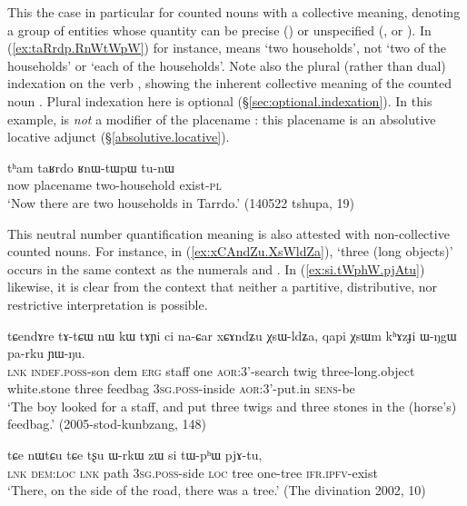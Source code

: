 This the case in particular for counted nouns with a collective meaning, denoting a group of entities whose quantity can be precise () or unspecified (,  or ). In (\ref{ex:taRrdp.RnWtWpW}) for instance,  means `two households', not `two of the households' or `each of the households'. Note also the plural (rather than dual) indexation on the verb , showing the inherent collective meaning of the counted noun . Plural indexation here is optional (§\ref{sec:optional.indexation}). In this example,  is \textit{not} a modifier of the placename : this placename is an absolutive locative adjunct (§\ref{absolutive.locative}).

\begin{exe}
	\ex \label{ex:taRrdp.RnWtWpW}
	\gll tʰam taʁrdo ʁnɯ-tɯpɯ tu-nɯ \\
	now placename two-household exist-\textsc{pl} \\
	\glt `Now there are two households in Tarrdo.' (140522 tshupa, 19)
\end{exe} 


This neutral number quantification meaning is also attested with non-collective counted nouns. For instance, in (\ref{ex:xCAndZu.XsWldZa}),  `three (long objects)' occurs in the same context as the numerals  and . In (\ref{ex:si.tWphW.pjAtu}) likewise, it is clear from the context that neither a partitive, distributive, nor restrictive interpretation is possible.

\begin{exe}
	\ex \label{ex:xCAndZu.XsWldZa}
	\gll tɕendɤre tɤ-tɕɯ nɯ kɯ tɤɲi ci na-ɕar xɕɤndʑu χsɯ-ldʑa, qapi χsɯm kʰɤzɟi ɯ-ŋgɯ pa-rku ɲɯ-ŋu. \\
	\textsc{lnk} \textsc{indef}.\textsc{poss}-son dem \textsc{erg} staff one \textsc{aor}:3'-search twig three-long.object white.stone three feedbag \textsc{3sg}.\textsc{poss}-inside \textsc{aor}:3'-put.in \textsc{sens}-be \\
	\glt `The boy looked for a staff, and put three twigs and three stones in the (horse's) feedbag.' (2005-stod-kunbzang, 148)
\end{exe} 

\begin{exe}
	\ex \label{ex:si.tWphW.pjAtu}
	\gll tɕe nɯtɕu tɕe tʂu ɯ-rkɯ zɯ si tɯ-pʰɯ pjɤ-tu,  \\
	\textsc{lnk} \textsc{dem}:\textsc{loc} \textsc{lnk} path \textsc{3sg}.\textsc{poss}-side \textsc{loc} tree one-tree \textsc{ifr}.\textsc{ipfv}-exist \\
	\glt `There, on the side of the road, there was a tree.' (The divination 2002, 10)
\end{exe} 

